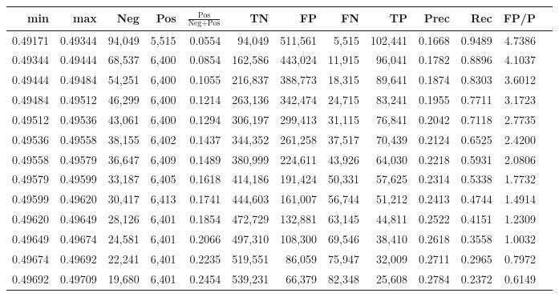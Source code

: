 \begin{tabular}{rrrrrrrrrrrrr}
\toprule
    min &     max &    Neg &   Pos & $\frac{\text{Pos}}{\text{Neg}+\text{Pos}}$ &      TN &      FP &      FN &      TP &   Prec &    Rec &   FP/P \\
\midrule
0.49171 & 0.49344 & 94,049 & 5,515 &                                     0.0554 &  94,049 & 511,561 &   5,515 & 102,441 & 0.1668 & 0.9489 & 4.7386 \\
0.49344 & 0.49444 & 68,537 & 6,400 &                                     0.0854 & 162,586 & 443,024 &  11,915 &  96,041 & 0.1782 & 0.8896 & 4.1037 \\
0.49444 & 0.49484 & 54,251 & 6,400 &                                     0.1055 & 216,837 & 388,773 &  18,315 &  89,641 & 0.1874 & 0.8303 & 3.6012 \\
0.49484 & 0.49512 & 46,299 & 6,400 &                                     0.1214 & 263,136 & 342,474 &  24,715 &  83,241 & 0.1955 & 0.7711 & 3.1723 \\
0.49512 & 0.49536 & 43,061 & 6,400 &                                     0.1294 & 306,197 & 299,413 &  31,115 &  76,841 & 0.2042 & 0.7118 & 2.7735 \\
0.49536 & 0.49558 & 38,155 & 6,402 &                                     0.1437 & 344,352 & 261,258 &  37,517 &  70,439 & 0.2124 & 0.6525 & 2.4200 \\
0.49558 & 0.49579 & 36,647 & 6,409 &                                     0.1489 & 380,999 & 224,611 &  43,926 &  64,030 & 0.2218 & 0.5931 & 2.0806 \\
0.49579 & 0.49599 & 33,187 & 6,405 &                                     0.1618 & 414,186 & 191,424 &  50,331 &  57,625 & 0.2314 & 0.5338 & 1.7732 \\
0.49599 & 0.49620 & 30,417 & 6,413 &                                     0.1741 & 444,603 & 161,007 &  56,744 &  51,212 & 0.2413 & 0.4744 & 1.4914 \\
0.49620 & 0.49649 & 28,126 & 6,401 &                                     0.1854 & 472,729 & 132,881 &  63,145 &  44,811 & 0.2522 & 0.4151 & 1.2309 \\
0.49649 & 0.49674 & 24,581 & 6,401 &                                     0.2066 & 497,310 & 108,300 &  69,546 &  38,410 & 0.2618 & 0.3558 & 1.0032 \\
0.49674 & 0.49692 & 22,241 & 6,401 &                                     0.2235 & 519,551 &  86,059 &  75,947 &  32,009 & 0.2711 & 0.2965 & 0.7972 \\
0.49692 & 0.49709 & 19,680 & 6,401 &                                     0.2454 & 539,231 &  66,379 &  82,348 &  25,608 & 0.2784 & 0.2372 & 0.6149 \\

\end{tabular}

